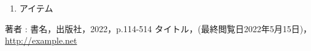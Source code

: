 \documentclass[a4paper]{ltjsarticle}
\newcommand{\maru}[1]{\raisebox{.5pt}{\textcircled{\raisebox{-.9pt}{#1}}}}
\begin{document}
\begin{enumerate}[label=\maru{\arabic*}]
  \item アイテム
\end{enumerate}

\begin{thebibliography}{99}
   著者 : 書名，出版社，2022，p.114-514
   タイトル，(最終閲覧日2022年5月15日)，\url{http://example.net}
\end{thebibliography}
\end{document}
